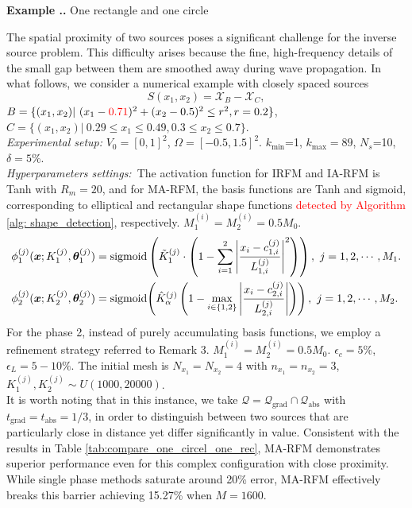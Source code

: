 \documentclass{article}
\newcommand{\red}[1]{\textcolor{red}{#1}}
\theoremstyle{plain}
\theoremstyle{definition}
\newcounter{example}[section]         %
\renewcommand{\theexample}{\thesection.\arabic{example}}
\newenvironment{example}[1][]{
    \refstepcounter{example}%
    \par\noindent\textbf{Example \theexample.} #1 \par
}{\par}
\begin{document}
{\begin{example}[{One rectangle and one circle}]\label{ex:One rectangle and one circle}The spatial proximity of two sources poses a significant challenge for the inverse source problem. This difficulty arises because the fine,  high-frequency details of the small gap between them are smoothed away during wave propagation. In what follows,  we consider a numerical example with closely spaced sources
$$S(x_1, x_2)=\mathcal{X}_B-\mathcal{X}_C,$$  $B=\{(x_1, x_2)|\ (x_1-\red{0.71})^2+(x_2-0.5)^2 \leq r^2 ,  r=0.2\}$,  $C=\{(x_1, x_2)|\ 0.29\le x_1 \le 0.49,  0.3\le x_2 \le 0.7 \}$.\\
\noindent \emph{Experimental setup:}  $V_0=[0, 1]^2$,  $\Omega=[-0.5, 1.5]^2$. $k_{\text{min}}$=1,  $k_{\text{max}}=89$,  $N_s$=10,  $\delta=5\%$.\\
\noindent \emph{Hyperparameters settings:}\ The activation function for IRFM and IA-RFM is Tanh with $R_m=20$,  and for MA-RFM,  the basis functions are Tanh and sigmoid, corresponding to elliptical and rectangular shape functions \red{detected by Algorithm \ref{alg: shape_detection}},  respectively. $M_1^{(i)}=M_2^{(i)}=0.5M_0$. 
\begin{align*}
& \phi_1^{(j)}(\boldsymbol{x};K_1^{(j)},\boldsymbol{\theta}_1^{(j)}) = \text{sigmoid}\left(\tilde{K}_1^{(j)} \cdot \left(1- \sum_{i=1}^2\left|\frac{x_i - c_{1,i}^{(j)}}{L_{1,i}^{(j)}}\right|^2\right)\right)
    ,\  j=1, 2, \cdots, M_1. \notag\\
    &\phi_{2}^{(j)}(\boldsymbol{x};K_2^{(j)},\boldsymbol{\theta}_2^{(j)})=\text{sigmoid}  \!\left(
    \hat{K}_\alpha^{(j)}
    \left(
    1-\max_{i\in\{1,2\}}
    \left|\frac{x_i-c_{2,i}^{(j)}}{L_{2,i}^{(j)}}\right|
    \right)
    \right),\ j=1, 2, \cdots, M_2. \notag
\end{align*}
 {For the phase 2, instead
of purely accumulating basis functions, we employ a refinement strategy referred to Remark 3. $M^{(i)}_1=M^{(i)}_2=0.5M_0$.}  $\epsilon_c=5\%$,  $\epsilon_{L}=5-10\%$. The initial mesh is $N_{x_1}=N_{x_2}=4$ with $n_{x_1}=n_{x_2}=3$,  $K_1^{(j)},K_2^{(j)}\sim U(1000,20000)$. \\

 {It is worth noting that in this instance, we take $\mathcal{Q}=\mathcal{Q}_{\text{grad}}\cap \mathcal{Q}_{\text{abs}}$ with $t_{\text{grad}}=t_{\text{abs}}=1/3$, in order to distinguish between two sources that are particularly close in distance yet differ significantly in value. Consistent with the results in Table \ref{tab:compare_one_circel_one_rec}, MA-RFM demonstrates superior performance even for this complex configuration with close proximity. While single phase methods saturate around 20\% error, MA-RFM effectively breaks this barrier achieving 15.27\% when $M=1600$.}


\end{example}}
\end{document}

